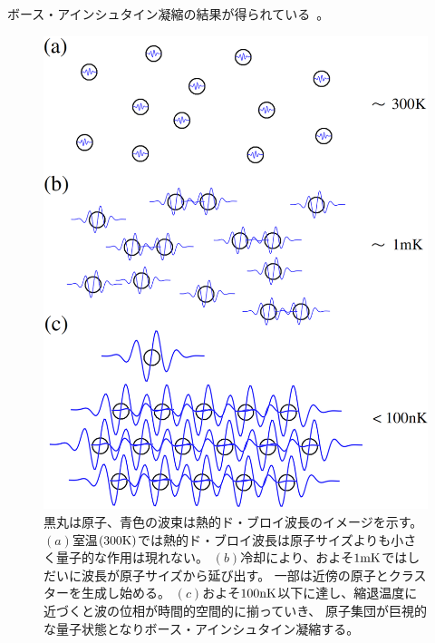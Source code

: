 \documentclass[12pt,a4paper]{jbook}
\begin{document}
        	ボース・アインシュタイン凝縮の結果が得られている~\cite{Anderson}。
		\begin{figure}[H]
			\begin{center}
				\includegraphics[width=11.5cm]{bec.eps}
				\caption{
                    黒丸は原子、青色の波束は熱的ド・ブロイ波長のイメージを示す。
                    $(a)$室温$(300{\rm K})$では熱的ド・ブロイ波長は原子サイズよりも小さく量子的な作用は現れない。
                    $(b)$冷却により、およそ$1{\rm mK}$ではしだいに波長が原子サイズから延び出す。
                    一部は近傍の原子とクラスターを生成し始める。
                    $(c)$およそ$100{\rm nK}$以下に達し、縮退温度に近づくと波の位相が時間的空間的に揃っていき、
                    原子集団が巨視的な量子状態となりボース・アインシュタイン凝縮する。
				}
				\label{FIG:bec}
			\end{center}
		\end{figure}
\end{document}
